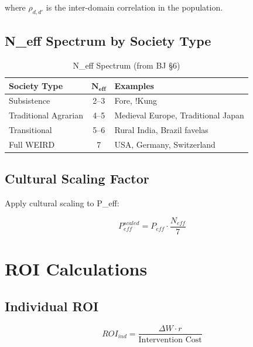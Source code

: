 where $\rho_{d,d'}$ is the inter-domain correlation in the population.

\subsection{N\_eff Spectrum by Society Type}

\begin{table}[htbp]
\centering
\caption{N\_eff Spectrum (from BJ §6)}
\label{tab:neff-spectrum}
\renewcommand{\arraystretch}{1.3}
\begin{tabular}{@{}lcl@{}}
\toprule
\textbf{Society Type} & $\boldsymbol{N_{eff}}$ & \textbf{Examples} \\
\midrule
Subsistence & 2--3 & Fore, !Kung \\
Traditional Agrarian & 4--5 & Medieval Europe, Traditional Japan \\
Transitional & 5--6 & Rural India, Brazil favelas \\
Full WEIRD & 7 & USA, Germany, Switzerland \\
\bottomrule
\end{tabular}
\end{table}

\subsection{Cultural Scaling Factor}

Apply cultural scaling to P\_eff:

\begin{equation}
P_{eff}^{scaled} = P_{eff} \cdot \frac{N_{eff}}{7}
\label{eq:peff-scaled}
\end{equation}


\section{ROI Calculations}
\label{sec:calc-roi}

\subsection{Individual ROI}

\begin{equation}
ROI_{ind} = \frac{\Delta W \cdot r}{\text{Intervention Cost}}
\label{eq:roi-individual}
\end{equation}

